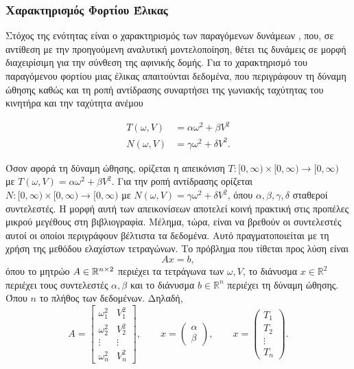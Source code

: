 \subsubsection{Χαρακτηρισμός Φορτίου Έλικας}
Στόχος της ενότητας είναι ο χαρακτηρισμός των παραγόμενων δυνάμεων , 
που, σε αντίθεση με την προηγούμενη αναλυτική μοντελοποίηση, θέτει τις δυνάμεις 
σε μορφή διαχειρίσιμη για την σύνθεση της αφινικής δομής. Για το χαρακτηρισμό 
του παραγόμενου φορτίου μιας έλικας απαιτούνται δεδομένα, που περιγράφουν τη 
δύναμη ώθησης καθώς και τη ροπή αντίδρασης συναρτήσει της γωνιακής ταχύτητας του 
κινητήρα και την ταχύτητα ανέμου

\begin{align*}
    T(\omega, V) &= \alpha \omega^2 + \beta V^2 \\
    N(\omega, V) &= \gamma \omega^2 + \delta V^2.
\end{align*}


Όσον αφορά τη δύναμη ώθησης, ορίζεται η απεικόνιση 
\(T:[0, \infty) \times [0, \infty) \rightarrow [0, \infty) \) με 
\( T(\omega, V) = \alpha \omega ^2 + \beta V ^2  \). Για την ροπή αντίδρασης 
ορίζεται \(N:[0, \infty) \times [0, \infty) \rightarrow [0, \infty) \) με 
\( N(\omega, V) = \gamma \omega ^2 + \delta V ^2  \), όπου \(\alpha, \beta, 
\gamma, \delta\) σταθεροί συντελεστές. Η μορφή αυτή των απεικονίσεων αποτελεί
κοινή πρακτική στις προπέλες μικρού μεγέθους στη βιβλιογραφία. Μέλημα, τώρα, 
είναι να βρεθούν οι συντελεστές αυτοί οι οποίοι περιγράφουν βέλτιστα τα 
δεδομένα. Αυτό πραγματοποιείται με τη χρήση της μεθόδου ελαχίστων τετραγώνων.
Το πρόβλημα που τίθεται προς λύση είναι 
\begin{equation*}
    Ax = b,
\end{equation*} 
όπου το μητρώο $A \in \mathbb{R}^{n \times 2}$ περιέχει τα τετράγωνα των 
$\omega, V$, το διάνυσμα $x \in \mathbb{R}^2$ περιέχει τους συντελεστές 
$\alpha, \beta$ και το διάνυσμα $b \in \mathbb{R}^n$ περιέχει τη δύναμη 
ώθησης. Όπου \(n\) το πλήθος των δεδομένων. Δηλαδή,
\begin{equation*}
    A = \begin{bmatrix}
            \omega_1 ^2 & V_1 ^2\\
            \omega_2 ^2 & V_2 ^2\\
            \vdots      & \vdots\\
            \omega_n ^2 & V_n ^2 
        \end{bmatrix}
    ,\qquad 
    x = \begin{pmatrix}
            \alpha\\\beta
        \end{pmatrix}
    ,\qquad
    x = \begin{pmatrix}
        T_1 \\
        T_2 \\
        \vdots\\
        T_n 
        \end{pmatrix}.
    \end{equation*} 

